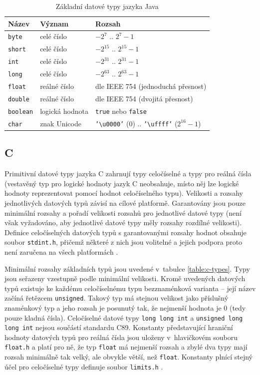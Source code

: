 \documentclass[onepage, a4paper, 12pt]{bakalarka}
\begin{document}
\begin{table}\centering
\caption{Základní datové typy jazyka Java}
\begin{tabular}{| l | l | l |}
\hline
\textbf{Název} & \textbf{Význam} & \textbf{Rozsah} \\ \hline
\texttt{byte} & celé číslo & $-2^7$ .. $2^7-1$ \\ \hline
\texttt{short} & celé číslo & $-2^{15}$ .. $2^{15}-1$ \\ \hline
\texttt{int} & celé číslo & $-2^{31}$ .. $2^{31}-1$ \\ \hline
\texttt{long} & celé číslo & $-2^{63}$ .. $2^{63}-1$ \\ \hline
\texttt{float} & reálné číslo & dle IEEE 754 (jednoduchá přesnost) \\ \hline
\texttt{double} & reálné číslo & dle IEEE 754 (dvojitá přesnost) \\ \hline
\texttt{boolean} & logická hodnota & \texttt{true} nebo \texttt{false} \\ \hline
\texttt{char} & znak Unicode & \texttt{'\textbackslash u0000'} ($0$) .. \texttt{'\textbackslash uffff'} ($2^{16} - 1$) \\ \hline
\end{tabular}
\label{table:java-types}
\end{table}

\subsection{C}
Primitivní datové typy jazyka C zahrnují typy celočíselné a typy pro reálná čísla (vestavěný typ pro logické hodnoty jazyk C neobsahuje, místo něj lze logické hodnoty reprezentovat pomocí hodnot celočíselného typu). Velikosti a rozsahy jednotlivých datových typů závisí na cílové platformě. Garantovány jsou pouze minimální rozsahy a pořadí velikosti rozsahů pro jednotlivé datové typy (není však vyžadováno, aby jednotlivé datové typy měly rozsahy rozdílné velikosti). Definice celočíselných datových typů s garantovanými rozsahy hodnot obsahuje soubor \texttt{stdint.h}, přičemž některé z nich jsou volitelné a jejich podpora proto není zaručena na všech platformách \cite{c-guide, cpp-guide-stdint}.\par

Minimální rozsahy základních typů jsou uvedené v~tabulce \ref{table:c-types}. Typy jsou seřazeny vzestupně podle minimální velikosti. Kromě uvedených datových typů existuje ke každému celočíselnému typu bezznaménková varianta -- její název začíná řetězcem \texttt{unsigned}. Takový typ má stejnou velikost jako příslušný znaménkový typ a jeho rozsah je posunutý tak, že nejmenší hodnota je 0 (tedy pouze kladná čísla). Celočíselné datové typy \texttt{long long int} a \texttt{unsigned long long int} nejsou součástí standardu C89. Konstanty představující hraniční hodnoty datových typů pro reálná čísla jsou uloženy v~hlavičkovém souboru \texttt{float.h} a platí pro ně, že typ \texttt{float} má nejmenší rozsah a zbylé dva typy mají rozsah minimálně tak velký, ale obvykle větší, než \texttt{float}. Konstanty plnící stejný účel pro celočíselné typy definuje soubor \texttt{limits.h} \cite{c-guide}.
\end{document}
